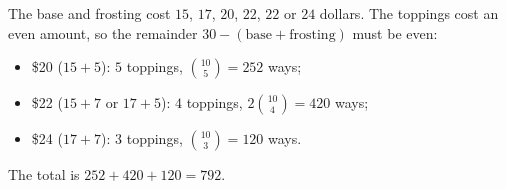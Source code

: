 The base and frosting cost $15$, $17$, $20$, $22$, $22$ or $24$ dollars. The toppings cost an even amount, so the remainder $30-(\text{base}+\text{frosting})$ must be even:
\begin{itemize}
\item \$20 ($15+5$): $5$ toppings, $\binom{10}5=252$ ways;
\item \$22 ($15+7$ or $17+5$): $4$ toppings, $2\binom{10}4=420$ ways;
\item \$24 ($17+7$): $3$ toppings, $\binom{10}3=120$ ways.
\end{itemize}
The total is $252+420+120=\boxed{792}$.
